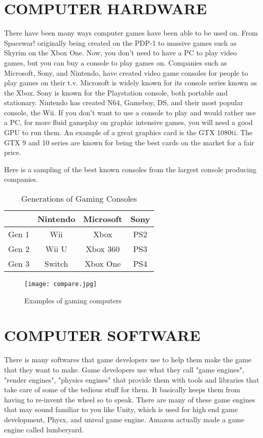 \documentclass[letterpaper, 10 pt, conference]{IEEEconf}
\begin{document}
\section{COMPUTER HARDWARE}

There have been many ways computer games have been able
to be used on. From Spacewar! originally being created on the
PDP-1 to massive games such as Skyrim on the Xbox One. 
Now, you don't need to have a PC to play video games, but 
you can buy a console to play games on. Companies such as
Microsoft, Sony, and Nintendo, have created video game
consoles for people to play games on their t.v. Microsoft
is widely known for its console series known as the Xbox.
Sony is known for the Playstation console, both portable
and stationary. Nintendo has created N64, Gameboy,
DS, and their most popular console, the Wii. If you don't
want to use a console to play and would rather use a PC, for
more fluid gameplay on graphic intensive games, you will need
a good GPU to run them. An example of a great graphics
card is the GTX 1080ti. The GTX 9 and 10 series are known
for being the best cards on the market for a fair price.

Here is a sampling of the best known consoles from the 
largest console producing companies.
\begin{table}[h!]
\begin{center}
\begin{tabular}{||c | c | c | c||} 
\hline
  & Nintendo & Microsoft & Sony \\ [0.5ex]
\hline\hline
Gen 1 & Wii & Xbox & PS2 \\ 
\hline
Gen 2 & Wii U & Xbox 360 & PS3 \\
\hline
Gen 3 & Switch & Xbox One & PS4 \\
\hline
\end{tabular}
\caption{Generations of Gaming Consoles}
\label{tbl:example}
\end{center}
\end{table}

\begin{figure}[h!]
\centering
\texttt{[image: compare.jpg]}
\caption{Examples of gaming computers}
\label{fig:example}
\end{figure}

\section{COMPUTER SOFTWARE}
	There is many softwares that game developers use to help them make the game that they want to make. Game developers use what they call "game engines", "render engines", "physics engines" that provide them with tools and libraries that take care of some of the tedious stuff for them. It basically keeps them from having to re-invent the wheel so to speak. There are many of these game engines that may sound familiar to you like Unity, which is used for high end game development, Physx, and unreal game engine. Amazon actually made a game engine called lumberyard.
\end{document}
